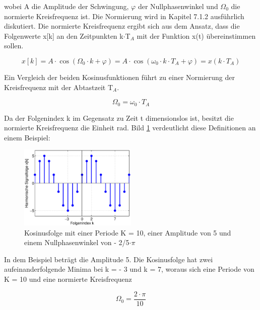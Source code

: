 \noindent wobei A die Amplitude der Schwingung, $\varphi$ der Nullphasenwinkel und $\Omega{}_{0}$ die normierte Kreisfrequenz ist. Die Normierung wird in Kapitel 7.1.2 ausf\"{u}hrlich diskutiert. Die normierte Kreisfrequenz ergibt sich aus dem Ansatz, dass die Folgenwerte x[k] an den Zeitpunkten k$\cdot$T${}_{A}$ mit der Funktion x(t) \"{u}bereinstimmen sollen.

\begin{equation}\label{eq:threefiftyone}
x\left[k\right]=A\cdot \cos \left(\Omega _{0} \cdot k+\varphi \right)=A\cdot \cos \left(\omega _{0} \cdot k\cdot T_{A} +\varphi \right)=x\left(k\cdot T_{A} \right)
\end{equation}

\noindent Ein Vergleich der beiden Kosinusfunktionen f\"{u}hrt zu einer Normierung der Kreisfrequenz mit der Abtastzeit T${}_{A}$. 

\begin{equation}\label{eq:threefiftytwo}
\Omega _{0} =\omega _{0} \cdot T_{A} 
\end{equation}

\noindent Da der Folgenindex k im Gegensatz zu Zeit t dimensionslos ist, besitzt die normierte Kreisfrequenz die Einheit rad. Bild \ref{fig:KosinusFolge} verdeutlicht diese Definitionen an einem Beispiel:

\begin{figure}[H]
  \centerline{\includegraphics[width=0.5\textwidth]{Kapitel3/Bilder/image20.eps}}
  \caption{Kosinusfolge mit einer Periode K = 10, einer Amplitude von 5 und einem Nullphasenwinkel von - 2/5$\cdot\pi$}
  \label{fig:KosinusFolge}
\end{figure}

\noindent In dem Beispiel betr\"{a}gt die Amplitude 5. Die Kosinusfolge hat zwei aufeinanderfolgende Minima bei k = - 3 und k = 7, woraus sich eine Periode von K = 10 und eine normierte Kreisfrequenz 

\begin{equation}\label{eq:threefiftythree}
\Omega _{0} =\frac{2\cdot \pi }{10} 
\end{equation}

